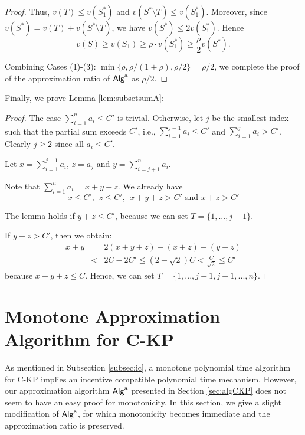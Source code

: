 \documentclass{aamas2013}
\begin{document}
\begin{proof}
Thus, $v(T) \le  v({S_1^\ast})$ and $v({S^\ast\setminus T}) \le  v({S_1^\ast})$.  Moreover, since $v({S^\ast})=v(T)+v({S^\ast\setminus T})$, we have $v({S^\ast}) \le  2v({S_1^\ast})$.  Hence  
\begin{equation*}
v(S) \ge v(S_1)\ge  \rho \cdot v(S_1^\ast)\ge\frac{\rho}{2} v({S^\ast}).
\end{equation*}


Combining Cases (1)-(3): $\min\{\rho, \rho/(1+\rho), \rho/2 \} = \rho/2$, we complete the proof of the approximation ratio of ${\sf Alg}^{\rm a}$ as $\rho/2$.
\end{proof}

Finally, we prove Lemma \ref{lem:subsetsumA}:

\begin{proof} 
The case $\sum_{i=1}^{n} a_i\leq C'$ is trivial.  Otherwise, 
let $j$ be the smallest index such that the partial sum exceeds $C'$, i.e., $\sum_{i=1}^{j-1} a_i \le  C'$ and $\sum_{i=1}^{j} a_i>C'$.  Clearly $j \ge 2$ since all $a_i \le  C'$.

Let $x=\sum_{i=1}^{j-1} a_i$, $z=a_j$ and $y = \sum_{i=j+1}^{n} a_i$.  

Note that $\sum_{i = 1}^{n} a_i = x+y+z$.  We already have 
\begin{equation*}
x \le  C',\ \ z \le  C',\ \ 
x+y+z > C' \mbox{\ \ and\ \ } x+z > C'
\end{equation*}

The lemma holds if $y+z \le  C'$, because we can set $T = \{1 ,..., j-1 \}$.  

If $y+z> C'$, then we obtain:
\begin{eqnarray*}
x+y & = & 2(x+y+z)-(x+z)-(y+z)  \\
& < & 2C-2C'\le  (2-\sqrt{2})C  < \frac{C}{\sqrt{2}}\le C'
\end{eqnarray*}
because $x+y+z \le  C$.
Hence, we can set $T = \{1 ,..., j-1, j+1, ..., n\}$.  
\end{proof}

\section{Monotone Approximation Algorithm for C-KP}\label{sec:monalg}
\noindent
As mentioned in Subsection \ref{subsec:ic}, a monotone polynomial time algorithm for C-KP
implies an incentive compatible polynomial time mechanism.  However, our approximation algorithm ${\sf Alg}^{\rm a}$ presented in Section \ref{sec:algCKP} does not seem to have an easy proof for monotonicity.
In this section, we give a slight modification of ${\sf Alg}^{\rm a}$, for which monotonicity becomes immediate and the approximation ratio is preserved.
\end{document}
